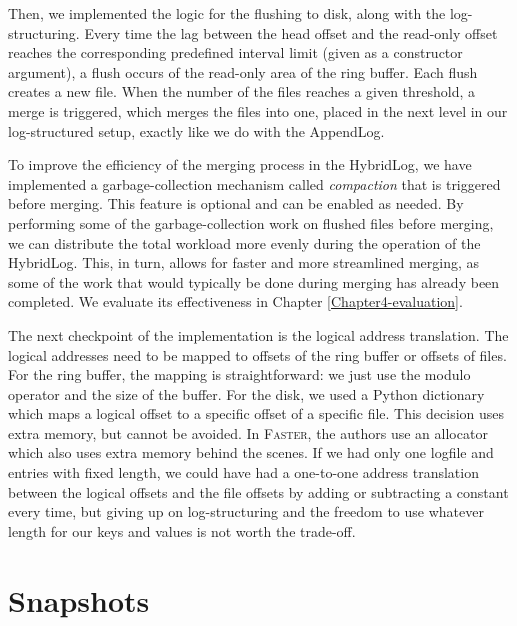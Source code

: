 Then, we implemented the logic for the flushing to disk, along with the log-structuring. Every time the lag between the head offset and the read-only offset reaches the corresponding predefined interval limit (given as a constructor argument), a flush occurs of the read-only area of the ring buffer. Each flush creates a new file. When the number of the files reaches a given threshold, a merge is triggered, which merges the files into one, placed in the next level in our log-structured setup, exactly like we do with the AppendLog.

To improve the efficiency of the merging process in the HybridLog, we have implemented a garbage-collection mechanism called \textit{compaction} that is triggered before merging. This feature is optional and can be enabled as needed. By performing some of the garbage-collection work on flushed files before merging, we can distribute the total workload more evenly during the operation of the HybridLog. This, in turn, allows for faster and more streamlined merging, as some of the work that would typically be done during merging has already been completed. We evaluate its effectiveness in Chapter \ref{Chapter4-evaluation}.

The next checkpoint of the implementation is the logical address translation. The logical addresses need to be mapped to offsets of the ring buffer or offsets of files. For the ring buffer, the mapping is straightforward: we just use the modulo operator and the size of the buffer. For the disk, we used a Python dictionary which maps a logical offset to a specific offset of a specific file. This decision uses extra memory, but cannot be avoided. In \textsc{Faster}, the authors use an allocator which also uses extra memory behind the scenes. If we had only one logfile and entries with fixed length, we could have had a one-to-one address translation between the logical offsets and the file offsets by adding or subtracting a constant every time, but giving up on log-structuring and the freedom to use whatever length for our keys and values is not worth the trade-off.



\section{Snapshots}
\label{section-snapshots}

